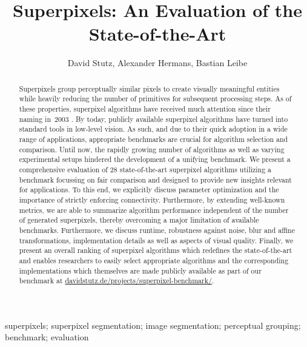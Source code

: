 \documentclass[5p]{elsarticle}
\begin{document}
\begin{frontmatter}
\title{Superpixels: An Evaluation of the State-of-the-Art}

\author{David Stutz, Alexander Hermans, Bastian Leibe}
\address{Visual Computing Institute, RWTH Aachen University, Germany}

\begin{abstract}
    Superpixels group perceptually similar pixels to create visually meaningful
    entities while heavily reducing the number of primitives for subsequent
    processing steps. As of these properties,
    superpixel algorithms have received much attention since their naming in~2003 \cite{RenMalik:2003}.
    By today, publicly available superpixel algorithms have
    turned into standard tools in low-level vision. As such, and due to their quick
    adoption in a wide range of applications, appropriate benchmarks are crucial
    for algorithm selection and comparison. Until now, the rapidly growing number of
    algorithms as well as varying experimental setups hindered the development
    of a unifying benchmark. We present a comprehensive evaluation of 28 state-of-the-art
    superpixel algorithms utilizing a benchmark focussing on fair comparison and
    designed to provide new insights relevant for applications. To this end, we explicitly discuss
    parameter optimization and the importance of strictly enforcing connectivity.
    Furthermore, by extending well-known metrics,
    we are able to summarize algorithm performance independent of the number of
    generated superpixels, thereby overcoming a major limitation of available benchmarks.
    Furthermore, we discuss runtime, robustness against noise, blur and affine transformations,
    implementation details as well as aspects of visual quality.
    Finally, we present an overall ranking of superpixel algorithms
    which redefines the state-of-the-art and enables researchers to easily select
    appropriate algorithms and the corresponding implementations which themselves
    are made publicly available as part of our benchmark at \url{davidstutz.de/projects/superpixel-benchmark/}.
\end{abstract}
\begin{keyword}
    superpixels; superpixel segmentation; image segmentation; perceptual grouping; benchmark; evaluation
\end{keyword}
\end{frontmatter}



\end{document}
